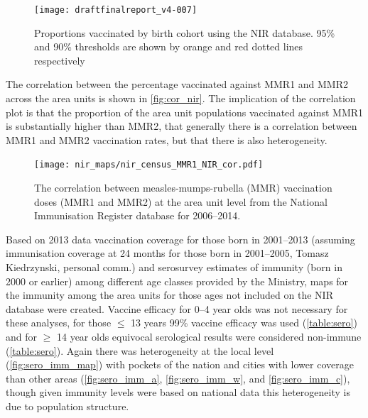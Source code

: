 \documentclass{article}
\begin{document}
\clearpage


\begin{figure}
\begin{center}
\texttt{[image: draftfinalreport\_v4-007]}
\end{center}
\caption{Proportions vaccinated by birth cohort using the NIR database. 95\% and 90\% thresholds are shown by orange and red dotted lines respectively}
\label{fig:mmr_nir}
\end{figure}

The correlation between the percentage vaccinated against MMR1 and MMR2 across the area units is shown in \autoref{fig:cor_nir}. The implication of the correlation plot is that the proportion of the area unit populations vaccinated against MMR1 is substantially higher than MMR2, that generally there is a correlation between MMR1 and MMR2 vaccination rates, but that there is also heterogeneity.

\begin{figure}[H]
     \begin{center}
     \texttt{[image: nir\_maps/nir\_census\_MMR1\_NIR\_cor.pdf]}
     \end{center}
     \caption{The correlation between measles-mumps-rubella (MMR) vaccination doses (MMR1 and MMR2) at the area unit level from the National Immunisation Register database for 2006--2014.}
     \label{fig:cor_nir}
\end{figure}

Based on 2013 data vaccination coverage for those born in 2001--2013 (assuming immunisation coverage at 24 months for those born in 2001--2005, Tomasz Kiedrzynski, personal comm.) and serosurvey estimates of immunity (born in 2000 or earlier) among different age classes provided by the Ministry, maps for the immunity among the area units for those ages not included on the NIR database were created. Vaccine efficacy for 0--4 year olds was not necessary for these analyses, for those $\leq$ 13 years 99\% vaccine efficacy was used (\autoref{table:sero}) and for $\geq$ 14 year olds equivocal serological results were considered non-immune (\autoref{table:sero}). Again there was heterogeneity at the local level (\autoref{fig:sero_imm_map}) with pockets of the nation and cities with lower coverage than other areas (\autoref{fig:sero_imm_a}, \autoref{fig:sero_imm_w}, and \autoref{fig:sero_imm_c}), though given immunity levels were based on national data this heterogeneity is due to population structure.
\end{document}
